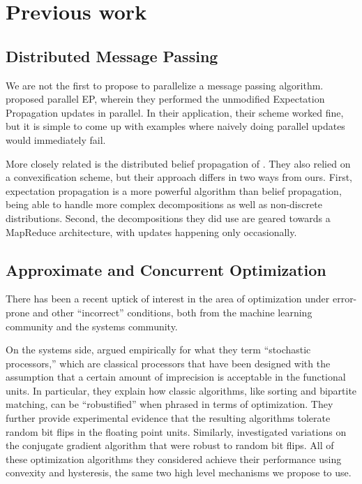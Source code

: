 \documentclass[12pt,leqno,twoside]{article}
\begin{document}
\section{Previous work}

\subsection{Distributed Message Passing}

We are not the first to propose to parallelize a message passing
algorithm. \citet{CsekeHeskes2010} proposed parallel EP, wherein
they performed the unmodified Expectation Propagation updates in
parallel. In their application, their scheme worked fine, but it
is simple to come up with examples where naively doing parallel
updates would immediately fail.

More closely related is the distributed belief propagation of
\citet{schwing2011distributed}. They also relied on a convexification scheme, but
their approach differs in two ways from ours. First, expectation
propagation is a more powerful algorithm than belief propagation,
being able to handle more complex decompositions as well as
non-discrete distributions. Second, the decompositions they did use
are geared towards a MapReduce architecture, with updates happening
only occasionally. 

\subsection{Approximate and Concurrent Optimization}

There has been a recent uptick of interest in the area of optimization
under error-prone and other ``incorrect'' conditions, both from the
machine learning community and the systems community.

On the systems side, 
\citet{sartori11stochastic} argued empirically
for what they term ``stochastic processors,'' which are classical
processors that have been designed with the assumption that a certain
amount of imprecision is acceptable in the functional units. In particular, they explain how classic algorithms, like sorting and bipartite matching, can
be ``robustified'' when phrased in terms of optimization. They further 
provide experimental evidence that the resulting algorithms tolerate 
random bit flips in the floating point units. Similarly, \citet{oberil11numerical} investigated variations on the conjugate gradient algorithm that
were robust to random bit flips. All of these optimization algorithms
they considered achieve their performance using convexity and
hysteresis, the same two high level mechanisms we propose to use. 
\end{document}
